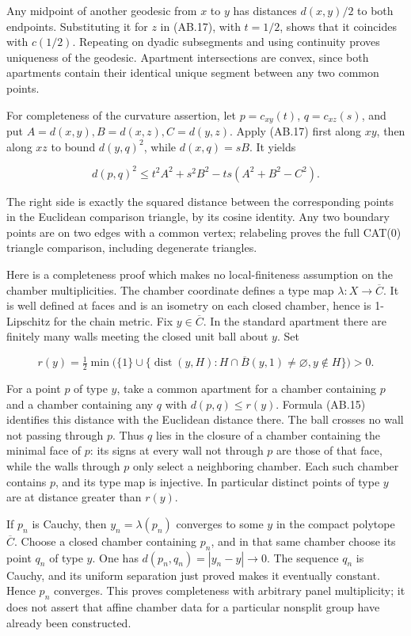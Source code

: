 \documentclass[
  11pt,
]{article}
\begin{document}
Any midpoint of another geodesic from \(x\) to \(y\) has distances
\(d(x,y)/2\) to both endpoints. Substituting it for \(z\) in (AB.17),
with \(t=1/2\), shows that it coincides with \(c(1/2)\). Repeating on
dyadic subsegments and using continuity proves uniqueness of the
geodesic. Apartment intersections are convex, since both apartments
contain their identical unique segment between any two common points.

For completeness of the curvature assertion, let \(p=c_{xy}(t)\),
\(q=c_{xz}(s)\), and put \(A=d(x,y), B=d(x,z), C=d(y,z)\). Apply (AB.17)
first along \(xy\), then along \(xz\) to bound \(d(y,q)^2\), while
\(d(x,q)=sB\). It yields

\[
 d(p,q)^2\le t^2A^2+s^2B^2-ts(A^2+B^2-C^2).
 \tag{AB.18}
\]

The right side is exactly the squared distance between the corresponding
points in the Euclidean comparison triangle, by its cosine identity. Any
two boundary points are on two edges with a common vertex; relabeling
proves the full CAT(0) triangle comparison, including degenerate
triangles.

Here is a completeness proof which makes no local-finiteness assumption
on the chamber multiplicities. The chamber coordinate defines a type map
\(\lambda:X\to\overline C\). It is well defined at faces and is an
isometry on each closed chamber, hence is 1-Lipschitz for the chain
metric. Fix \(y\in\overline C\). In the standard apartment there are
finitely many walls meeting the closed unit ball about \(y\). Set

\[
 r(y)=\tfrac12\min\bigl(\{1\}\cup
 \{\operatorname{dist}(y,H):H\cap\overline B(y,1)\ne\varnothing, y\notin H\}\bigr)>0.
 \tag{AB.19}
\]

For a point \(p\) of type \(y\), take a common apartment for a chamber
containing \(p\) and a chamber containing any \(q\) with
\(d(p,q)\le r(y)\). Formula (AB.15) identifies this distance with the
Euclidean distance there. The ball crosses no wall not passing through
\(p\). Thus \(q\) lies in the closure of a chamber containing the
minimal face of \(p\): its signs at every wall not through \(p\) are
those of that face, while the walls through \(p\) only select a
neighboring chamber. Each such chamber contains \(p\), and its type map
is injective. In particular distinct points of type \(y\) are at
distance greater than \(r(y)\).

If \(p_n\) is Cauchy, then \(y_n=\lambda(p_n)\) converges to some \(y\)
in the compact polytope \(\overline C\). Choose a closed chamber
containing \(p_n\), and in that same chamber choose its point \(q_n\) of
type \(y\). One has \(d(p_n,q_n)=|y_n-y|\to0\). The sequence \(q_n\) is
Cauchy, and its uniform separation just proved makes it eventually
constant. Hence \(p_n\) converges. This proves completeness with
arbitrary panel multiplicity; it does not assert that affine chamber
data for a particular nonsplit group have already been constructed.
\end{document}
